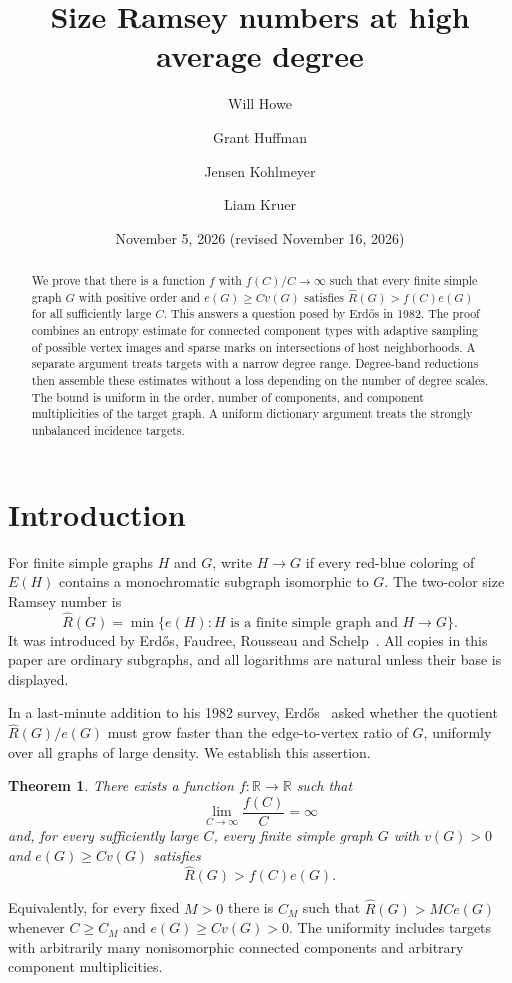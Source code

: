 \documentclass[11pt]{amsart}
\title[Size Ramsey numbers at high average degree]{Size Ramsey numbers at high average degree}
\author{Will Howe}
\author{Grant Huffman}
\author{Jensen Kohlmeyer}
\author{Liam Kruer}
\date{November 5, 2026 (revised November 16, 2026)}
\newtheorem{theorem}{Theorem}[section]
\theoremstyle{definition}
\theoremstyle{remark}
\numberwithin{equation}{section}
\begin{document}
\begin{abstract}
We prove that there is a function $f $ with $ f(C)/C\to\infty$ such that
every finite simple graph $G $ with positive order and $ e(G)\ge C v(G)$ satisfies
$\widehat R(G)>f(C)e(G)$ for all sufficiently large $ C$.
This answers a question posed by Erd\H{o}s in 1982.
The proof combines an entropy estimate for connected component types with
adaptive sampling of possible vertex images and sparse marks on intersections
of host neighborhoods. A separate argument treats targets with a narrow degree
range. Degree-band reductions then assemble these estimates without a loss
depending on the number of degree scales. The bound is uniform in the order,
number of components, and component multiplicities of the target graph.
A uniform dictionary argument treats the strongly unbalanced incidence
targets.
\end{abstract}
\maketitle

\section{Introduction}\label{sec:introduction}

For finite simple graphs $H $ and $ G $, write $ H\to G$ if every red-blue
coloring of $E(H)$ contains a monochromatic subgraph isomorphic to $ G$.
The two-color size Ramsey number is
\[
 \widehat R(G)=\min\{e(H): H\text{ is a finite simple graph and }H\to G\}.
\]
It was introduced by Erd\H{o}s, Faudree, Rousseau and Schelp~\cite{EFRS}.
All copies in this paper are ordinary subgraphs, and all logarithms are natural
unless their base is displayed.

In a last-minute addition to his 1982 survey, Erd\H{o}s~\cite[p.~78]{Erdos}
asked whether the quotient $\widehat R(G)/e(G)$ must grow faster than the
edge-to-vertex ratio of $G$, uniformly over all graphs of large density.
We establish this assertion.

\begin{theorem}\label{thm:main}
There exists a function $f:\mathbb R\to\mathbb R$ such that
\[
 \lim_{C\to\infty}\frac{f(C)}{C}=\infty
\]
and, for every sufficiently large $C $, every finite simple graph $ G$ with
$v(G)>0$ and $ e(G)\ge C v(G)$ satisfies
\[
 \widehat R(G)>f(C)e(G).
\]
\end{theorem}

Equivalently, for every fixed $M>0$ there is $ C_M$ such that
$\widehat R(G)>M C e(G)$ whenever $ C\ge C_M $ and $ e(G)\ge C v(G)>0$.
The uniformity includes targets with arbitrarily many nonisomorphic connected
components and arbitrary component multiplicities.
\end{document}

